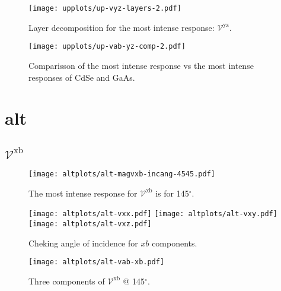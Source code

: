 \documentclass{article}
\let\Oldsection\section
\renewcommand{\section}{\FloatBarrier\Oldsection}
\let\Oldsubsection\subsection
\renewcommand{\subsection}{\FloatBarrier\Oldsubsection}
\begin{document}
\begin{figure}[ht]
    \centering
    \texttt{[image: upplots/up-vyz-layers-2.pdf]}
    \caption{Layer decomposition for the most intense response:
    $\mathcal{V}^{\mathrm{yz}}$.}
    \label{fig:up-lay2}
\end{figure}

\begin{figure}[ht]
    \centering
    \texttt{[image: upplots/up-vab-yz-comp-2.pdf]}
    \caption{Comparisson of the most intense response vs the most intense
    responses of CdSe and GaAs.}
    \label{fig:up-comp2}
\end{figure}




\section{alt} %
\label{sec:alt}

\subsection{$\mathcal{V}^{\mathrm{xb}}$}
\begin{figure}[h!]
    \centering
    \texttt{[image: altplots/alt-magvxb-incang-4545.pdf]}
    \caption{The most intense response for $\mathcal{V}^{\mathrm{xb}} $ is for 
    145$^{\circ}$.}
    \label{fig:alt-magvxbincang}
\end{figure}
\begin{figure}[h!]
    \centering
    \texttt{[image: altplots/alt-vxx.pdf]}
    \texttt{[image: altplots/alt-vxy.pdf]}\\
    \texttt{[image: altplots/alt-vxz.pdf]}
    \caption{Cheking angle of incidence for $xb$ components.}
    \label{fig:alt-xbangcomp}
\end{figure}
\begin{figure}[t!]
    \centering
    \texttt{[image: altplots/alt-vab-xb.pdf]}
    \caption{Three components of $\mathcal{V}^{\mathrm{xb}} $ @ 145$^{\circ}$.}
    \label{fig:alt-vxb1}
\end{figure}
\end{document}

